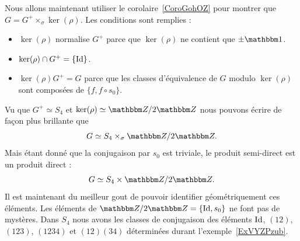 Nous allons maintenant utiliser le corolaire~\ref{CoroGohOZ} pour montrer que \( G=G^+\times_{\sigma}\ker(\rho)\). Les conditions sont remplies :
\begin{itemize}
    \item \( \ker(\rho)\) normalise \( G^+\) parce que \( \ker(\rho)\) ne contient que \( \pm\mtu\).
    \item \( \ker(\rho)\cap G^+=\{ \operatorname{Id} \}\).
    \item \( \ker(\rho)G^+=G\) parce que les classes d'équivalence de \( G\) modulo \( \ker(\rho)\) sont composées de \( \{ f,f\circ s_0 \}\).
\end{itemize}
Vu que \( G^+\simeq S_4\) et \( \ker(\rho)\simeq \eZ/2\eZ\) nous pouvons écrire de façon plus brillante que
\begin{equation}
    G\simeq S_4\times_{\sigma}\eZ/2\eZ.
\end{equation}
Mais étant donné que la conjugaison par \( s_0\) est triviale, le produit semi-direct est un produit direct :
\begin{equation}
    G\simeq S_4\times\eZ/2\eZ.
\end{equation}
Il est maintenant du meilleur gout de pouvoir identifier géométriquement ces éléments. Les éléments de \( \eZ/2\eZ=\{ \id,s_0 \}\) ne font pas de mystères. Dans \( S_4\) nous avons les classes de conjugaison des éléments \( \operatorname{Id}\), \( (12)\), \( (123)\), \( (1234)\) et \( (12)(34)\) déterminées durant l'exemple~\ref{ExVYZPzub}.
